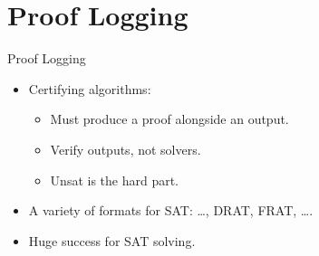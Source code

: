 \documentclass{beamer}
\begin{document}
\section{Proof Logging}

\begin{frame}{Proof Logging}
    \begin{itemize}
        \item Certifying algorithms:
            \begin{itemize}
                \item Must produce a proof alongside an output.
                \item Verify outputs, not solvers.
                \item Unsat is the hard part.
            \end{itemize}
        \item A variety of formats for SAT: \ldots, DRAT, FRAT, \ldots.
        \item Huge success for SAT solving.
    \end{itemize}
\end{frame}
\end{document}
